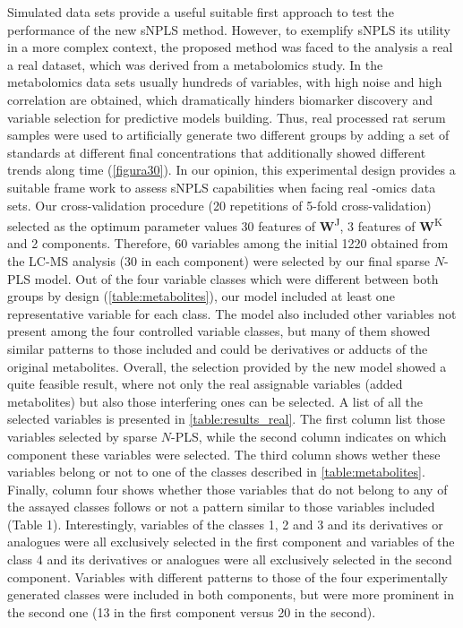Simulated data sets provide a useful suitable first approach to test the performance of the new sNPLS method. However, to exemplify sNPLS its utility in a more complex context, the proposed method was faced to the analysis a real a real dataset, which was derived from a metabolomics study. In the metabolomics data sets usually hundreds of variables, with high noise and high correlation are obtained, which dramatically hinders biomarker discovery and variable selection for predictive models building.  Thus, real processed rat serum samples were used to artificially generate two different groups by adding a set of standards at different final concentrations that additionally  showed different trends along time (\autoref{figura30}).  In our opinion, this experimental design provides a suitable frame work to assess sNPLS capabilities when facing real -omics data sets.
Our cross-validation procedure (20 repetitions of 5-fold cross-validation) selected as the optimum parameter values 30 features of \textbf{W}\textsuperscript{J}, 3 features of \textbf{W}\textsuperscript{K} and 2 components. Therefore, 60 variables among the initial 1220 obtained from the LC-MS analysis (30 in each component) were selected by our final sparse $N$-PLS model. Out of the four variable classes which were different between both groups by design (\autoref{table:metabolites}), our model included at least one representative variable for each class. The model also included other variables not present among the four controlled variable classes, but many of them showed similar patterns to those included and could be derivatives or adducts of the original metabolites. Overall, the selection provided by the new model showed a quite feasible result, where not only the real assignable variables (added metabolites) but also those interfering ones can be selected. A list of all the selected variables is presented in \autoref{table:results_real}. The first column list those variables selected by sparse $N$-PLS, while  the second column indicates on which component these variables were selected. The third column shows wether these variables belong or not to one of the classes described in \autoref{table:metabolites}. Finally, column four shows whether those variables that do not belong to any of the assayed classes follows or not a pattern similar to those variables included (Table 1). Interestingly, variables of the classes 1, 2 and 3 and its derivatives or analogues were all exclusively selected in the first component and variables of the class 4 and its derivatives or analogues were all exclusively selected in the second component. Variables with different patterns to those of the four experimentally generated classes were included in both components, but were more prominent in the second one (13 in the first component versus 20 in the second). 

